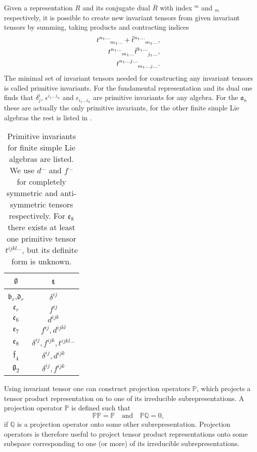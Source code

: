 Given a representation $R$ and its conjugate dual $\overbar{R}$ with index $^m$ and $_m$ respectively, it is possible to create new invariant tensors from given invariant tensors by summing, taking products and contracting indices
\begin{equation}
\begin{aligned}
\tensor{t}{^{n_1\ldots}_{m_1\ldots}}+\tensor{\tilde{t}}{^{n_1\ldots}_{m_1\ldots}},\\
\tensor{t}{^{n_1\ldots}_{m_1\ldots}}\tensor{\tilde{t}}{^{k_1\ldots}_{j_1\ldots}},\\
\tensor{t}{^{n_1\ldots j\ldots}_{m_1\ldots j\ldots}}.
\end{aligned}
\end{equation}
The minimal set of invariant tensors needed for constructing any invariant tensors is called  primitive invariants. For the fundamental representation and its dual one finds that $\delta^i_j$, $\epsilon^{i_1\ldots i_n}$ and $\epsilon_{i_1\ldots i_n}$ are primitive invariants for any algebra. For the $\mathfrak{a}_n$ these are actually the only primitive invariants, for the other finite simple Lie algebras the rest is listed in .
\begin{table}\centering
    \caption{Primitive invariants for finite simple Lie algebras are listed. We use $d^{\ldots}$ and $f^{\ldots}$ for completely symmetric and anti-symmetric tensors respectively. For $\mathfrak{e}_8$ there exists at least one primitive tensor $t^{ijkl\ldots}$, but its definite form is unknown.}
    \label{tab:PrimInvariant}
    \begin{tabular}{|c|c|}\hline
        $\mathfrak{g}$ & t\\\hline
        $\mathfrak{b}_r$,$\mathfrak{d}_r$ & $\delta^{ij}$\\\hline
        $\mathfrak{c}_r$ & $f^{ij}$\\\hline
        $\mathfrak{e}_6$ & $d^{ijk}$\\\hline
        $\mathfrak{e}_7$ & $f^{ij},d^{ijkl}$\\\hline
        $\mathfrak{e}_8$ & $\delta^{ij},f^{ijk},t^{ijkl\ldots}$\\\hline
        $\mathfrak{f}_4$ & $\delta^{ij},d^{ijk}$\\\hline
        $\mathfrak{g}_2$ & $\delta^{ij},f^{ijk}$\\\hline
    \end{tabular}
\end{table}

Using invariant tensor one can construct projection operators $\mathbb{P}$, which projects a tensor product representation on to one of its irreducible subrepresentations. A projection operator $\mathbb{P}$ is defined such that 
\begin{equation}
    \mathbb{P}\mathbb{P} = \mathbb{P}\quad \text{and}\quad \mathbb{P}\mathbb{Q} = 0,
\end{equation}
if $\mathbb{Q}$ is a projection operator onto some other subrepresentation. Projection operators is therefore useful to project tensor product representations onto some subspace corresponding to one (or more) of its irreducible subrepresentations. 


